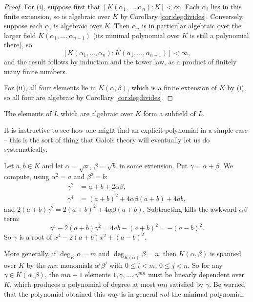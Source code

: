 \documentclass[a4paper]{scrartcl}
\begin{document}
\begin{proof}
	For (i), suppose first that $[K(\alpha_1, \dots, \alpha_n):K] < \infty$. Each $\alpha_i$ lies in this finite extension, so is algebraic over $K$ by Corollary \ref{cor:degdivides}. Conversely, suppose each $\alpha_i$ is algebraic over $K$. Then $\alpha_n$ is in particular algebraic over the larger field $K(\alpha_1, \dots, \alpha_{n-1})$ (its minimal polynomial over $K$ is still a polynomial there), so
	$$[K(\alpha_1, \dots, \alpha_n) : K(\alpha_1, \dots, \alpha_{n-1})] < \infty,$$
	and the result follows by induction and the tower law, as a product of finitely many finite numbers.

	For (ii), all four elements lie in $K(\alpha, \beta)$, which is a finite extension of $K$ by (i), so all four are algebraic by Corollary \ref{cor:degdivides}.
\end{proof}

\begin{corollary}
	The elements of $L$ which are algebraic over $K$ form a subfield of $L$.
\end{corollary}

It is instructive to see how one might find an explicit polynomial in a simple case -- this is the sort of thing that Galois theory will eventually let us do systematically.

\begin{example}
	Let $a, b \in K$ and let $\alpha = \sqrt a$, $\beta = \sqrt b$ in some extension. Put $\gamma = \alpha + \beta$. We compute, using $\alpha^2 = a$ and $\beta^2 = b$:
	\begin{align*}
		\gamma^2 &= a + b + 2\alpha\beta, \\
		\gamma^4 &= (a+b)^2 + 4\alpha\beta(a+b) + 4ab,
	\end{align*}
	and $2(a+b)\gamma^2 = 2(a+b)^2 + 4\alpha\beta(a+b)$. Subtracting kills the awkward $\alpha\beta$ term:
	$$\gamma^4 - 2(a+b)\gamma^2 = 4ab - (a+b)^2 = -(a-b)^2.$$
	So $\gamma$ is a root of $x^4 - 2(a+b)x^2 + (a-b)^2$.
\end{example}

More generally, if $\deg_K \alpha = m$ and $\deg_{K(\alpha)} \beta = n$, then $K(\alpha,\beta)$ is spanned over $K$ by the $mn$ monomials $\alpha^i \beta^j$ with $0 \leq i < m$, $0 \leq j < n$. So for any $\gamma \in K(\alpha,\beta)$, the $mn+1$ elements $1, \gamma, \dots, \gamma^{mn}$ must be linearly dependent over $K$, which produces a polynomial of degree at most $mn$ satisfied by $\gamma$. Be warned that the polynomial obtained this way is in general \emph{not} the minimal polynomial.
\end{document}
